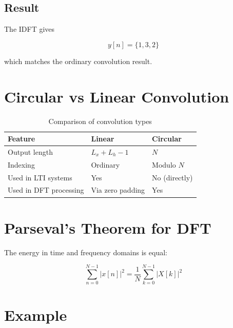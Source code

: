 
\subsection{Result}

The IDFT gives

\[
\boxed{
y[n]=\{1,3,2\}
}
\]

which matches the ordinary convolution result.


\section{Circular vs Linear Convolution}

\begin{table}[H]
\centering
\caption{Comparison of convolution types}
\begin{tabular}{|p{5cm}|p{4cm}|p{4cm}|}
\hline
\textbf{Feature} & \textbf{Linear} & \textbf{Circular}\\
\hline
Output length & \(L_x+L_h-1\) & \(N\)\\
\hline
Indexing & Ordinary & Modulo \(N\)\\
\hline
Used in LTI systems & Yes & No (directly)\\
\hline
Used in DFT processing & Via zero padding & Yes\\
\hline
\end{tabular}
\end{table}


\section{Parseval’s Theorem for DFT}

The energy in time and frequency domains is equal:

\[
\boxed{
\sum_{n=0}^{N-1}|x[n]|^2
=
\frac{1}{N}
\sum_{k=0}^{N-1}|X[k]|^2
}
\]


\section{Example}

